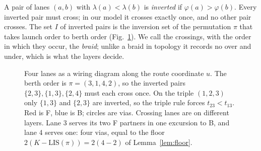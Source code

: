 \documentclass[journal]{IEEEtran}
\begin{document}
A pair of lanes $(a,b)$ with $\lambda(a)<\lambda(b)$ is \emph{inverted} if $\varphi(a)>\varphi(b)$. Every inverted pair must cross; in our model it crosses exactly once, and no other pair crosses. The set $I$ of inverted pairs is the inversion set of the permutation $\pi$ that takes launch order to berth order (Fig.~\ref{fig:braid}). We call the crossings, with the order in which they occur, the \emph{braid}; unlike a braid in topology it records no over and under, which is what the layers decide.

\begin{figure}[t]
\centering
{}
\caption{Four lanes as a wiring diagram along the route coordinate $u$. The berth order is $\pi=(3,1,4,2)$, so the inverted pairs $\{2,3\},\{1,3\},\{2,4\}$ must each cross once. On the triple $(1,2,3)$ only $\{1,3\}$ and $\{2,3\}$ are inverted, so the triple rule forces $t_{23}<t_{13}$. Red is F, blue is B; circles are vias. Crossing lanes are on different layers. Lane 3 serves its two F partners in one excursion to B, and lane 4 serves one: four vias, equal to the floor $2(K-\mathrm{LIS}(\pi))=2(4-2)$ of Lemma~\ref{lem:floor}.}
\label{fig:braid}
\end{figure}
\end{document}
